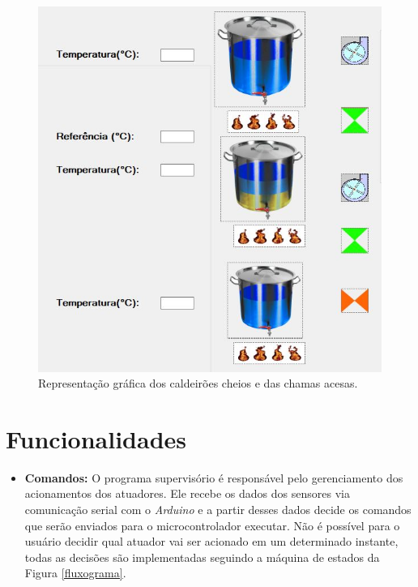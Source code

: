 \begin{figure}[htb]
	\caption{\label{Supervisorio02}Representação gráfica dos caldeirões cheios e das chamas acesas.}
	\begin{center}
	    \includegraphics[width=0.7\linewidth]{./img/Supervisorio02.jpg}
	\end{center}
\end{figure}

		\section{Funcionalidades}
\begin{itemize}
\item \textbf{Comandos:}
O programa supervisório é responsável pelo gerenciamento dos acionamentos dos atuadores. Ele recebe os dados dos sensores via comunicação serial com o \textit{Arduino} e a partir desses dados decide os comandos que serão enviados para o microcontrolador executar. Não é possível para o usuário decidir qual atuador vai ser acionado em um determinado instante, todas as decisões são implementadas seguindo a máquina de estados da Figura \ref{fluxograma}. 
\end{itemize}

